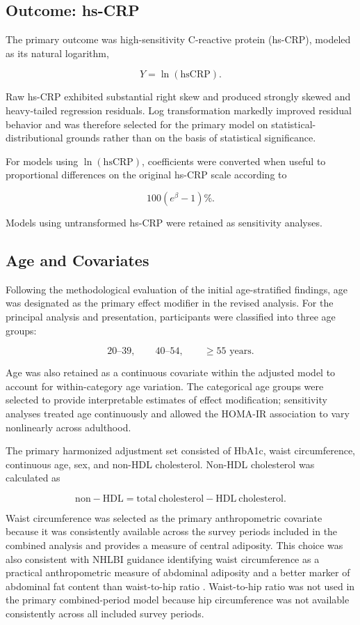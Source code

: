 \documentclass[11pt]{article}
\begin{document}
\subsection{Outcome: hs-CRP}

The primary outcome was high-sensitivity C-reactive protein (hs-CRP),
modeled as its natural logarithm,

\[
Y=\ln(\mathrm{hsCRP}).
\]

Raw hs-CRP exhibited substantial right skew and produced strongly skewed
and heavy-tailed regression residuals. Log transformation markedly improved
residual behavior and was therefore selected for the primary model on
statistical-distributional grounds rather than on the basis of statistical
significance.

For models using $\ln(\mathrm{hsCRP})$, coefficients were converted when
useful to proportional differences on the original hs-CRP scale according to

\[
100\left(e^\beta-1\right)\%.
\]

Models using untransformed hs-CRP were retained as sensitivity analyses.


\subsection{Age and Covariates}

Following the methodological evaluation of the initial age-stratified
findings, age was designated as the primary effect modifier in the revised
analysis. For the principal analysis and presentation, participants were
classified into three age groups:

\[
20\text{--}39,\qquad
40\text{--}54,\qquad
\geq55\text{ years}.
\]

Age was also retained as a continuous covariate within the adjusted model
to account for within-category age variation. The categorical age groups
were selected to provide interpretable estimates of effect modification;
sensitivity analyses treated age continuously and allowed the HOMA-IR
association to vary nonlinearly across adulthood.

The primary harmonized adjustment set consisted of HbA1c, waist
circumference, continuous age, sex, and non-HDL cholesterol. Non-HDL
cholesterol was calculated as

\[
\mathrm{non\!-\!HDL}
=
\mathrm{total\ cholesterol}
-
\mathrm{HDL\ cholesterol}.
\]

Waist circumference was selected as the primary anthropometric covariate
because it was consistently available across the survey periods included
in the combined analysis and provides a measure of central adiposity.
This choice was also consistent with NHLBI guidance identifying waist
circumference as a practical anthropometric measure of abdominal adiposity
and a better marker of abdominal fat content than waist-to-hip ratio
\citep{NHLBI1998Obesity}. Waist-to-hip ratio was not used in the primary
combined-period model because hip circumference was not available
consistently across all included survey periods.
\end{document}
